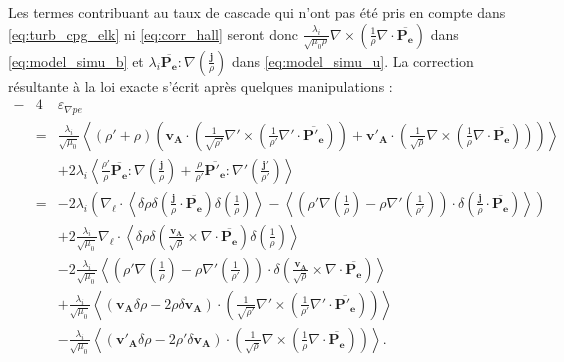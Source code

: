  Les termes contribuant au taux de cascade qui n'ont pas été pris en compte dans \eqref{eq:turb_cpg_elk} ni \eqref{eq:corr_hall} seront donc $\frac{\lambda_i}{ \sqrt{\mu_0\rho} }  \nabla \times \left(\frac{1}{\rho} \nabla \cdot \overline{\boldsymbol{P_{e}}}\right)$ dans \eqref{eq:model_simu_b} et $  \lambda_i \overline{\boldsymbol{P_{e}}} : \nabla \left(\frac{\boldsymbol{j}}{\rho} \right)$ dans \eqref{eq:model_simu_u}. La correction résultante à la loi exacte s'écrit après quelques manipulations : 
\begin{equation}
\label{eq:corr_pe} \boxed{
\begin{array}{lcl}
   -&4& \varepsilon_{\nabla pe}  \\%
   &=& \frac{\lambda_i}{\sqrt{\mu_0}} \left<\left(\rho' + \rho\right)\left(\boldsymbol{v_A} \cdot \left( \frac{1}{ \sqrt{\rho'} }  \nabla' \times \left(\frac{1}{\rho'} \nabla' \cdot \overline{\boldsymbol{P'_{e}}}\right)\right) + \boldsymbol{v'_A} \cdot \left( \frac{1}{ \sqrt{\rho} }  \nabla \times \left(\frac{1}{\rho} \nabla \cdot \overline{\boldsymbol{P_{e}}}\right)\right)\right) \right> \\%
   &&+ 2 \lambda_i\left< \frac{\rho'}{\rho}   \overline{\boldsymbol{P_{e}}} : \nabla \left(\frac{\boldsymbol{j}}{\rho} \right)   + \frac{\rho}{\rho'}  \overline{\boldsymbol{P'_{e}}} : \nabla' \left(\frac{\boldsymbol{j'}}{\rho'} \right) \right> \\%
   &=&   - 2 \lambda_i \left(\nabla_{\boldsymbol{\ell}} \cdot \left<\delta \rho \delta \left( \frac{ \boldsymbol{j}}{\rho} \cdot \overline{\boldsymbol{P_{e}}}\right) \delta \left(\frac{1}{\rho} \right) \right> - \left< \left(\rho'\nabla   \left(\frac{1}{\rho} \right) - \rho   \nabla'   \left(\frac{1}{\rho'} \right)\right) \cdot\delta \left(\frac{ \boldsymbol{j}}{\rho} \cdot \overline{\boldsymbol{P_{e}}}\right)\right>\right)  \\%
    &&+ 2 \frac{\lambda_i}{\sqrt{\mu_0}} \nabla_{\boldsymbol{\ell}} \cdot \left<\delta \rho \delta \left( \frac{\boldsymbol{v_A} }{\sqrt{\rho}} \times \nabla \cdot \overline{\boldsymbol{P_{e}}}\right) \delta \left(\frac{1}{\rho} \right) \right> \\
    &&-  2 \frac{\lambda_i}{\sqrt{\mu_0}}\left<  \left(\rho' \nabla   \left(\frac{1}{\rho} \right) - \rho \nabla'  \left(\frac{1}{\rho'} \right)\right)\cdot\delta \left(\frac{\boldsymbol{v_A}}{\sqrt{\rho}}  \times \nabla \cdot \overline{\boldsymbol{P_{e}}}\right)\right>\\%
   &&+\frac{\lambda_i}{\sqrt{\mu_0}} \left<\left(\boldsymbol{v_A} \delta  \rho  - 2 \rho \delta \boldsymbol{v_A}\right) \cdot \left( \frac{1}{ \sqrt{\rho'} }  \nabla' \times \left(\frac{1}{\rho'} \nabla' \cdot \overline{\boldsymbol{P'_{e}}}\right)\right) \right>\\ 
   &&-\frac{\lambda_i}{\sqrt{\mu_0}} \left<\left(\boldsymbol{v'_A} \delta  \rho  - 2 \rho' \delta \boldsymbol{v_A}\right) \cdot \left( \frac{1}{ \sqrt{\rho} }  \nabla \times \left(\frac{1}{\rho} \nabla \cdot \overline{\boldsymbol{P_{e}}}\right)\right) \right>.\\ %
   \end{array}}
\end{equation} 
